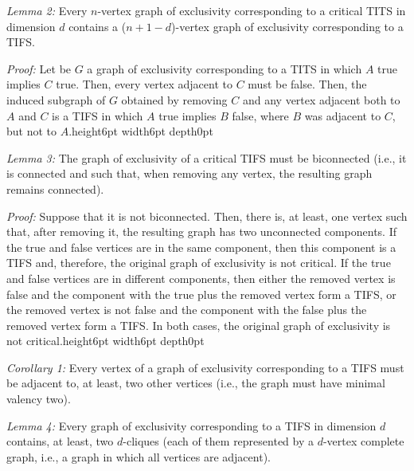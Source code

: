 \documentclass[%
 twocolumn,
 groupedaddress,
 showpacs,
 showkeys,
 preprintnumbers,
 amsmath,amssymb,
 aps,
 pra,
 longbibliography,
 floatfix,
 ]{revtex4-1}
\def\endproof{\vrule height6pt width6pt depth0pt}
\begin{document}

{\em Lemma 2:} Every $n$-vertex graph of exclusivity corresponding to a critical TITS in dimension $d$ contains a ($n+1-d$)-vertex graph of exclusivity corresponding to a TIFS.


{\em Proof:} Let be $G$ a graph of exclusivity corresponding to a TITS in which $A$ true implies $C$ true. Then, every vertex adjacent to $C$ must be false. Then, the induced subgraph of $G$ obtained by removing $C$ and any vertex adjacent both to $A$ and $C$ is a TIFS in which $A$ true implies $B$ false, where $B$ was adjacent to $C$, but not to $A$.\hfill \endproof


{\em Lemma 3:} The graph of exclusivity of a critical TIFS must be biconnected 
(i.e., it is connected and such that, when removing any vertex, the resulting graph remains connected).


{\em Proof:} Suppose that it is not biconnected. Then, there is, at least, one vertex such that, after removing it, the resulting graph has two unconnected components. If the true and false vertices are in the same component, then this component is a TIFS and, therefore, the original graph of exclusivity is not critical. If the true and false vertices are in different components, then either the removed vertex is false and the component with the true plus the removed vertex form a TIFS, or the removed vertex is not false and the component with the false plus the removed vertex form a TIFS. In both cases, the original graph of exclusivity is not critical.\hfill \endproof


{\em Corollary 1:} Every vertex of a graph of exclusivity corresponding to a TIFS must be adjacent to, at least, two other vertices (i.e., the graph must have minimal valency two).


{\em Lemma 4:} Every graph of exclusivity corresponding to a TIFS in dimension $d$ contains, at least, two $d$-cliques (each of them represented by a $d$-vertex complete graph, i.e., a graph in which all vertices are adjacent).
\end{document}
